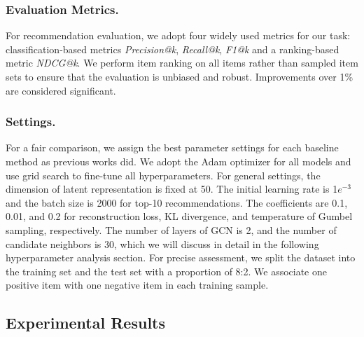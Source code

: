 \documentclass[letterpaper]{article} %
\begin{document}
\subsubsection{Evaluation Metrics.}
For recommendation evaluation, we adopt four widely used metrics for our task: classification-based metrics \textit{Precision@k}, \textit{Recall@k}, \textit{F1@k} and a ranking-based metric \textit{NDCG@k}. We perform item ranking on all items rather than sampled item sets to ensure that the evaluation is unbiased and robust. Improvements over 1\% are considered significant.

\subsubsection{Settings.}
For a fair comparison, we assign the best parameter settings for each baseline method as previous works did. We adopt the Adam optimizer for all models and use grid search to fine-tune all hyperparameters. For general settings, the dimension of latent representation is fixed at 50. The initial learning rate is 1$e^{-3}$ and the batch size is 2000 for top-10 recommendations. The coefficients are 0.1, 0.01, and 0.2 for reconstruction loss, KL divergence, and temperature of Gumbel sampling, respectively. The number of layers of GCN is 2, and the number of candidate neighbors is 30, which we will discuss in detail in the following hyperparameter analysis section. For precise assessment, we split the dataset into the training set and the test set with a proportion of 8:2. We associate one positive item with one negative item in each training sample.

\subsection{Experimental Results}
\end{document}

